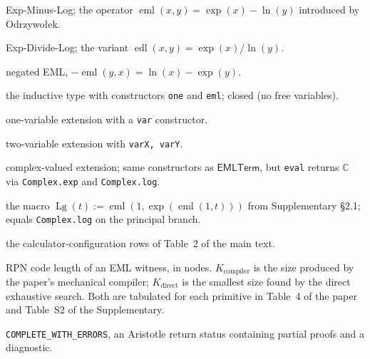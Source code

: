 \documentclass[11pt,a4paper]{article}
\theoremstyle{plain}
\theoremstyle{definition}
\newcommand{\eml}{\operatorname{eml}}
\newcommand{\edl}{\operatorname{edl}}
\newcommand{\Lg}{\operatorname{Lg}}
\newcommand{\C}{\mathbb{C}}
\newcommand{\EMLT}{\mathsf{EMLTerm}}
\newcommand{\EMLTC}{\mathsf{EMLTerm}_\C}
\begin{document}
\begin{description}[style=nextline,leftmargin=2em]
\item[EML] Exp-Minus-Log; the operator $\eml(x,y)=\exp(x)-\ln(y)$
introduced by Odrzywo\l{}ek.
\item[EDL] Exp-Divide-Log; the variant $\edl(x,y)=\exp(x)/\ln(y)$.
\item[$-\eml$] negated EML, $-\eml(y,x)=\ln(x)-\exp(y)$.
\item[$\EMLT$] the inductive type with constructors
\texttt{one} and \texttt{eml}; closed (no free variables).
\item[$\EMLT_1$] one-variable extension with a \texttt{var}
constructor.
\item[$\EMLT_2$] two-variable extension with \texttt{varX, varY}.
\item[$\EMLTC$] complex-valued extension; same constructors as
$\EMLT$, but \texttt{eval} returns $\C$ via \texttt{Complex.exp}
and \texttt{Complex.log}.
\item[$\Lg$] the macro $\Lg(t) := \eml(1,\exp(\eml(1,t)))$ from
Supplementary §2.1; equals \texttt{Complex.log} on the principal
branch.
\item[Calc 0--3, Wolfram] the calculator-configuration rows of
Table~2 of the main text.
\item[K] RPN code length of an EML witness, in nodes.
$K_{\text{compiler}}$ is the size produced by the paper's mechanical
compiler; $K_{\text{direct}}$ is the smallest size found by the
direct exhaustive search.  Both are tabulated for each primitive in
Table~4 of the paper and Table~S2 of the Supplementary.
\item[CWE] \texttt{COMPLETE\_WITH\_ERRORS}, an Aristotle return
status containing partial proofs and a diagnostic.
\end{description}
\end{document}
